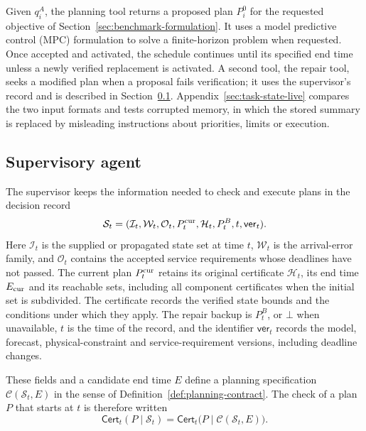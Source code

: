 \documentclass[final]{cas-sc}
\theoremstyle{definition}
\theoremstyle{plain}
\theoremstyle{definition}
\theoremstyle{plain}
\newcommand{\appref}[1]{Appendix~\ref{#1}}
\begin{document}
Given $q_i^{A}$, the planning tool returns a proposed plan $P_i^{0}$
for the requested objective of Section~\ref{sec:benchmark-formulation}. It uses
a model predictive control (MPC) formulation
\cite{geroliminis2013mpc} to solve a finite-horizon problem when
requested. Once accepted and activated, the schedule continues until
its specified end time unless a newly verified replacement is activated. A second tool, the repair tool, seeks a modified
plan when a proposal fails verification; it uses the supervisor's
record and is described in Section~\ref{sec:supervisory-agent}.
\appref{sec:task-state-live} compares the two input formats and
tests corrupted memory, in which the stored summary is replaced by
misleading instructions about priorities, limits or execution.

\subsection{Supervisory agent}
\label{sec:supervisory-agent}

The supervisor keeps the information needed to check and execute
plans in the decision record
\[
\mathcal S_t=(\mathcal I_t,\mathcal W_t,\mathcal O_t,P_t^{\rm cur},
\mathcal H_t,P_t^{B},t,\mathsf{ver}_t).
\]
Here $\mathcal I_t$ is the supplied or propagated state set at time
$t$, $\mathcal W_t$ is the arrival-error family, and $\mathcal O_t$
contains the accepted service requirements whose deadlines have not
passed. The current plan $P_t^{\rm cur}$ retains its original
certificate $\mathcal H_t$, its end time $E_{\rm cur}$ and its reachable sets,
including all component certificates when the initial set is
subdivided. The certificate records the verified state bounds and the
conditions under which they apply. The repair backup is $P_t^{B}$, or
$\bot$ when unavailable, $t$ is the time of the record, and the
identifier $\mathsf{ver}_t$ records the model, forecast,
physical-constraint and service-requirement versions, including
deadline changes.

These fields and a candidate end time $E$ define a planning
specification $\mathcal C(\mathcal S_t,E)$ in the sense of
Definition~\ref{def:planning-contract}. The check of a plan $P$
that starts at $t$ is therefore written
\[
\mathsf{Cert}_t(P\mid\mathcal S_t)
=\mathsf{Cert}_t\big(P\mid\mathcal C(\mathcal S_t,E)\big).
\]
\end{document}
